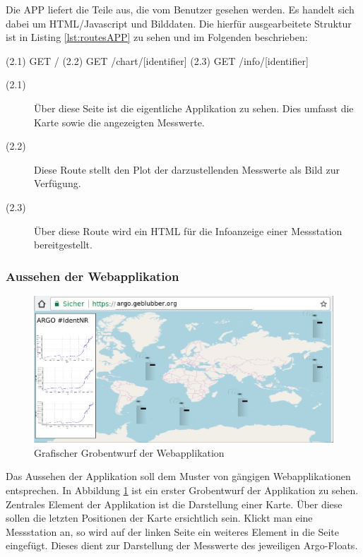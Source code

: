 Die APP liefert die Teile aus, die vom Benutzer gesehen werden. Es handelt sich dabei um HTML/Javascript und Bilddaten. Die hierfür ausgearbeitete Struktur ist in Listing \ref{lst:routesAPP} zu sehen und im Folgenden beschrieben:

\begin{python}[label={lst:routesAPP}, caption={Webrouten der Darstellung}]
(2.1) GET     /
(2.2) GET     /chart/[identifier]
(2.3) GET     /info/[identifier]
\end{python}

\begin{description}
 \item [(2.1)]
 Über diese Seite ist die eigentliche Applikation zu sehen. Dies umfasst die Karte sowie die angezeigten Messwerte.

 \item [(2.2)]
 Diese Route stellt den Plot der darzustellenden Messwerte als Bild zur Verfügung.

 \item [(2.3)]
 Über diese Route wird ein \gls{HTML} für die Infoanzeige einer Messstation bereitgestellt.

\end{description}


\pagebreak
\subsubsection{Aussehen der Webapplikation}
%
%

\begin{figure}[h!]
    \centering
    \includegraphics[width=\textwidth]{pix/EntwurfWebseite.png}
    \caption{Grafischer Grobentwurf der Webapplikation}
    \label{fig:entwurf_webseite}
\end{figure}

Das Aussehen der Applikation soll dem Muster von gängigen Webapplikationen entsprechen. In Abbildung \ref{fig:entwurf_webseite} ist ein erster Grobentwurf der Applikation zu sehen.
Zentrales Element der Applikation ist die Darstellung einer Karte. Über diese sollen die letzten Positionen der Karte ersichtlich sein.
Klickt man eine Messstation an, so wird auf der linken Seite ein weiteres Element in die Seite eingefügt. Dieses dient zur Darstellung der Messwerte des jeweiligen Argo-Floats.





